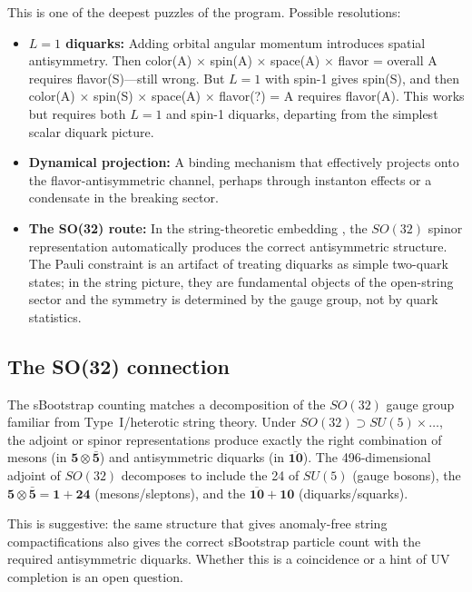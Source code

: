 \documentclass[12pt,a4paper]{article}
\begin{document}
This is one of the deepest puzzles of the program. Possible 
resolutions:
\begin{itemize}
\item \textbf{$L = 1$ diquarks:} Adding orbital angular momentum 
introduces spatial antisymmetry. Then color(A) $\times$ spin(A) 
$\times$ space(A) $\times$ flavor = overall A requires 
flavor(S)---still wrong. But $L=1$ with spin-1 gives spin(S), 
and then color(A) $\times$ spin(S) $\times$ space(A) $\times$ 
flavor(?) = A requires flavor(A). This works but requires both 
$L=1$ and spin-1 diquarks, departing from the simplest scalar 
diquark picture.
\item \textbf{Dynamical projection:} A binding mechanism that 
effectively projects onto the flavor-antisymmetric channel, perhaps 
through instanton effects or a condensate in the breaking sector.
\item \textbf{The SO(32) route:} In the string-theoretic embedding 
\cite{Rivero2005}, the $SO(32)$ spinor representation automatically 
produces the correct antisymmetric structure. The Pauli constraint 
is an artifact of treating diquarks as simple two-quark states; in 
the string picture, they are fundamental objects of the open-string 
sector and the symmetry is determined by the gauge group, not by 
quark statistics.
\end{itemize}

\subsection{The SO(32) connection}

The sBootstrap counting matches a decomposition of the $SO(32)$ gauge 
group familiar from Type~I/heterotic string theory. Under 
$SO(32) \supset SU(5) \times \ldots$, the adjoint or spinor 
representations produce exactly the right combination of mesons 
(in $\mathbf{5} \otimes \bar{\mathbf{5}}$) and antisymmetric 
diquarks (in $\overline{\mathbf{10}}$). The 496-dimensional adjoint 
of $SO(32)$ decomposes to include the 24 of $SU(5)$ (gauge bosons), 
the $\mathbf{5} \otimes \bar{\mathbf{5}} = \mathbf{1} + \mathbf{24}$ 
(mesons/sleptons), and the $\overline{\mathbf{10}} + \mathbf{10}$ 
(diquarks/squarks).

This is suggestive: the same structure that gives anomaly-free string 
compactifications also gives the correct sBootstrap particle count 
with the required antisymmetric diquarks. Whether this is a 
coincidence or a hint of UV completion is an open question.
\end{document}
